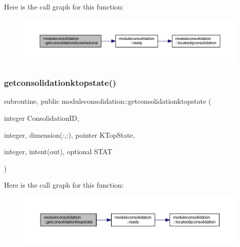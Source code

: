 Here is the call graph for this function\+:\nopagebreak
\begin{figure}[H]
\begin{center}
\leavevmode
\includegraphics[width=350pt]{namespacemoduleconsolidation_a34d40947baf053926b3fe4e02b7c1225_cgraph}
\end{center}
\end{figure}
\mbox{\label{namespacemoduleconsolidation_ace4ba590047f774affd5abf5e15b7e41}} 
\subsubsection{\texorpdfstring{getconsolidationktopstate()}{getconsolidationktopstate()}}
{\footnotesize\ttfamily subroutine, public moduleconsolidation\+::getconsolidationktopstate (\begin{DoxyParamCaption}\item[{integer}]{Consolidation\+ID,  }\item[{integer, dimension(\+:,\+:), pointer}]{K\+Top\+State,  }\item[{integer, intent(out), optional}]{S\+T\+AT }\end{DoxyParamCaption})}

Here is the call graph for this function\+:\nopagebreak
\begin{figure}[H]
\begin{center}
\leavevmode
\includegraphics[width=350pt]{namespacemoduleconsolidation_ace4ba590047f774affd5abf5e15b7e41_cgraph}
\end{center}
\end{figure}
\mbox{\label{namespacemoduleconsolidation_a9166ecea6df370e3decee58c70761e72}} 
